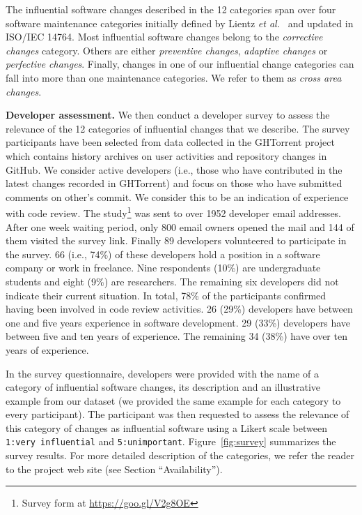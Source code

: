 The influential software changes described in the 12 categories span over
four software maintenance categories initially defined by Lientz {\em et
al.}~\cite{Lientz:1978:CAS:359511.359522} and updated in ISO/IEC 14764. Most
influential software changes belong to the {\em corrective changes} category.
Others are either {\em preventive changes}, {\em
adaptive changes} or {\em perfective changes}. Finally, changes in one of our influential change categories
 can fall into more than one maintenance categories. We refer to
them as {\em cross area changes}.

\textbf{Developer assessment.}
We then conduct a developer survey to assess the relevance of the 12 categories of influential changes that we describe. 
The survey participants have been selected from data collected in the GHTorrent project~\cite{Gousi13} which contains history
archives on user activities and repository changes in GitHub. We consider active developers (i.e., those who have contributed in the latest changes recorded in GHTorrent) and focus on those who have submitted comments on other's commit. We consider this to be an indication of experience with code review. The study\footnote{Survey form at \url{https://goo.gl/V2g8OE}} was sent to over 1952 developer email addresses. After one week waiting period, only 800 email owners opened the mail and 144 of them visited the survey link. Finally 89 developers volunteered to participate in the survey. 66 (i.e., 74\%) of these developers hold a position in a software company or work in freelance. Nine respondents (10\%) are undergraduate students and eight (9\%) are researchers. The remaining six developers did not indicate their current situation. In total, 78\% of the participants confirmed having been involved in code review activities. 26 (29\%) developers have between one and five years experience in software development. 29 (33\%) developers have between five and ten years of experience. The remaining 34 (38\%) have over ten years of experience. 

In the survey questionnaire, developers were provided with the name of a category of influential software changes, its description and an illustrative example from our dataset (we provided the same example for each category to every participant). The participant was then requested to assess the relevance of this category of changes as influential software using a Likert scale between {\tt 1:very influential} and {\tt 5:unimportant}. Figure~\ref{fig:survey} summarizes the survey results. For more detailed description of the categories, we refer the reader to the project web site (see Section ``Availability'').

